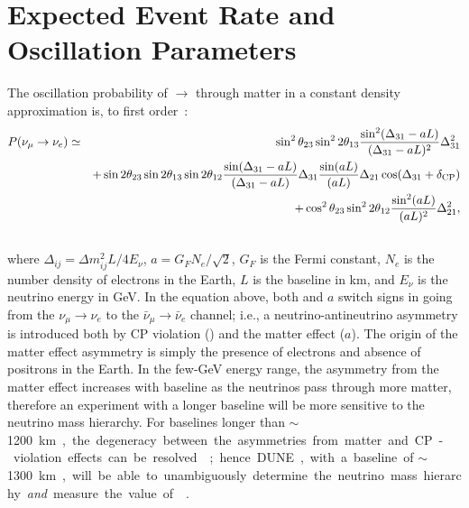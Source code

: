 \section{Expected Event Rate and Oscillation Parameters}
\label{sec:physics-lbnosc-osc}


The oscillation probability of \numu $\rightarrow$ \nue through matter in a constant density
approximation is,  %
to first order~\cite{Nunokawa:2007qh}:
%
\begin{eqnarray}
P(\nu_\mu \rightarrow \nu_e) & \simeq & \sin^2 \theta_{23} \sin^2 2 \theta_{13} 
\frac{ \sin^2(\Delta_{31} - aL)}{(\Delta_{31}-aL)^2} \Delta_{31}^2\\ \nonumber
& & + \sin 2 \theta_{23} \sin 2 \theta_{13} \sin 2 \theta_{12} \frac{ \sin(\Delta_{31} - aL)}{(\Delta_{31}-aL)} \Delta_{31} \frac{\sin(aL)}{(aL)} \Delta_{21} \cos (\Delta_{31} + \delta_{\rm CP})\\ \nonumber
& & + \cos^2 \theta_{23} \sin^2 2 \theta_{12} \frac {\sin^2(aL)}{(aL)^2} \Delta_{21}^2, \\ \nonumber
\label{eqn:appprob}
\end{eqnarray}
where $\Delta_{ij} = \Delta m^2_{ij} L/4E_\nu$, $a = G_FN_e/\sqrt{2}$, $G_F$ is the Fermi constant, $N_e$ is the number density of electrons in the Earth, $L$ is the baseline in km, and $E_\nu$ is the neutrino energy in GeV. 
In the equation above, both \deltacp and $a$ 
switch signs in going from the
$\nu_\mu \to \nu_e$ to the $\bar{\nu}_\mu \to \bar{\nu}_e$ channel; i.e.,
a neutrino-antineutrino asymmetry is introduced both by CP violation (\deltacp)
and the matter effect ($a$). The origin of the matter effect asymmetry 
is simply the presence of electrons and absence of positrons in the Earth.  
In the few-GeV energy range, the asymmetry from the matter effect increases with baseline as the neutrinos
pass through more matter, therefore an experiment with a longer baseline will be
more sensitive to the neutrino mass hierarchy. For baselines longer than 
$\sim$\SI{1200}\km, the degeneracy between the asymmetries from matter
and CP-violation effects can be resolved~\cite{Bass:2013vcg}; hence DUNE, with a baseline of $\sim$\SI{1300}\km, 
will be able to unambiguously
determine the neutrino mass hierarchy \textit{and} measure the value of \deltacp~\cite{Diwan:2004bt}. 


